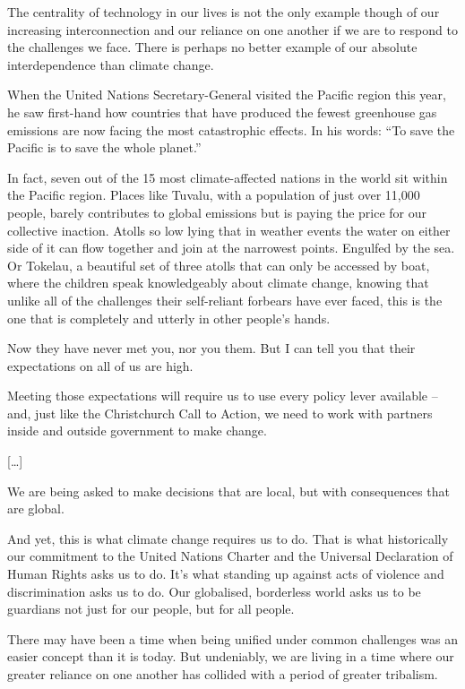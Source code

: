 \documentclass[10pt,a4paper]{article}
\begin{document}
The centrality of technology in our lives is not the only example though of our increasing interconnection and our reliance on one another if we are to respond to the challenges we face. There is perhaps no better example of our absolute interdependence than climate change.

When the United Nations Secretary-General visited the Pacific region this year, he saw first-hand how countries that have produced the fewest greenhouse gas emissions are now facing the most catastrophic effects. In his words: “To save the Pacific is to save the whole planet.”

In fact, seven out of the 15 most climate-affected nations in the world sit within the Pacific region. Places like Tuvalu, with a population of just over 11,000 people, barely contributes to global emissions but is paying the price for our collective inaction. Atolls so low lying that in weather events the water on either side of it can flow together and join at the narrowest points. Engulfed by the sea. Or Tokelau, a beautiful set of three atolls that can only be accessed by boat, where the children speak knowledgeably about climate change, knowing that unlike all of the challenges their self-reliant forbears have ever faced, this is the one that is completely and utterly in other people’s hands.

Now they have never met you, nor you them. But I can tell you that their expectations on all of us are high.

Meeting those expectations will require us to use every policy lever available – and, just like the Christchurch Call to Action, we need to work with partners inside and outside government to make change.

[…]

We are being asked to make decisions that are local, but with consequences that are global.

And yet, this is what climate change requires us to do. That is what historically our commitment to the United Nations Charter and the Universal Declaration of Human Rights asks us to do. It’s what standing up against acts of violence and discrimination asks us to do. Our globalised, borderless world asks us to be guardians not just for our people, but for all people.

There may have been a time when being unified under common challenges was an easier concept than it is today. But undeniably, we are living in a time where our greater reliance on one another has collided with a period of greater tribalism.
\end{document}
